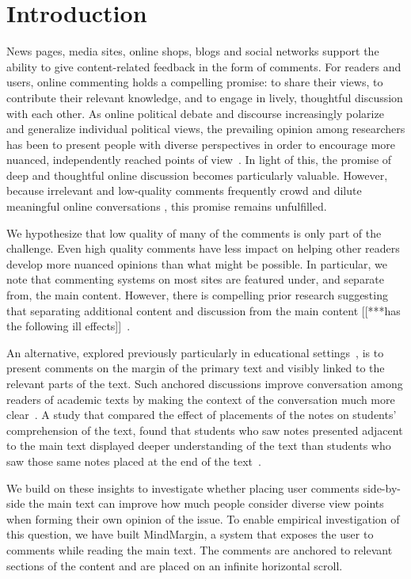 \section{Introduction}

News pages, media sites, online shops, blogs and social networks support the ability to give content-related feedback in the form of comments. For readers and users, online commenting holds a compelling promise: to share their views, to contribute their relevant knowledge, and to engage in lively, thoughtful discussion with each other. As online political debate and discourse increasingly polarize and generalize individual political views, the prevailing opinion among researchers has been to present people with diverse perspectives in order to encourage more nuanced, independently reached points of view~\cite{ConsiderIt,Politics,NewsCube}. In light of this, the promise of deep and thoughtful online discussion becomes particularly valuable. However, because irrelevant and low-quality comments frequently crowd and dilute meaningful online conversations \cite{CommentQuality, FlamingCommunications}, this promise remains unfulfilled.

We hypothesize that low quality of many of the comments is only part of the challenge.  Even high quality comments have less impact on helping other readers develop more nuanced opinions than what might be possible.  In particular, we note that commenting systems on most sites are featured under, and separate from, the main content.  However, there is compelling prior research suggesting that separating additional content and discussion from the main content [[***has the following ill effects]]~\cite{Brush,Guzdial,van,AnnotationsStudents,NewsInterfaces,FluidDocs,NB}.

An alternative, explored previously particularly in educational settings~\cite{Brush,Guzdial,van,AnnotationsStudents}, is to present comments on the margin of the primary text and visibly linked to the relevant parts of the text.  Such anchored discussions improve conversation among readers of academic texts by making the context of the conversation much more clear~\cite{Brush,Guzdial,van}.  A study that compared the effect of placements of the notes on students' comprehension of the text, found that students who saw notes presented adjacent to the main text displayed deeper understanding of the text than students who saw those same notes placed at the end of the text~\cite{AnnotationsStudents}.

We build on these insights to investigate whether placing user comments side-by-side the main text can improve how much people consider diverse view points when forming their own opinion of the issue.  To enable empirical investigation of this question, we have built MindMargin, a system that exposes the user to comments while reading the main text. The comments are anchored to relevant sections of the content and are placed on an infinite horizontal scroll.

